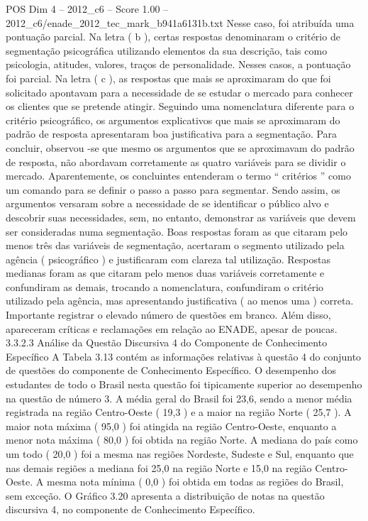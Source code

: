 \begin{textsample}{POS Dim 4 – 2012\_c6 – Score 1.00 – 2012\_c6/enade\_2012\_tec\_mark\_b941a6131b.txt}
Nesse caso, foi atribuída uma pontuação parcial.
Na letra ( b ), certas respostas denominaram o critério de segmentação psicográfica utilizando elementos da sua descrição, tais como psicologia, atitudes, valores, traços de personalidade.
Nesses casos, a pontuação foi parcial.
Na letra ( c ), as respostas que mais se aproximaram do que foi solicitado apontavam para a necessidade de se estudar o mercado para conhecer os clientes que se pretende atingir.
Seguindo uma nomenclatura diferente para o critério psicográfico, os argumentos explicativos que mais se aproximaram do padrão de resposta apresentaram boa justificativa para a segmentação.
Para concluir, observou -se que mesmo os argumentos que se aproximavam do padrão de resposta, não abordavam corretamente as quatro variáveis para se dividir o mercado.
Aparentemente, os concluintes entenderam o termo “ critérios ” como um comando para se definir o passo a passo para segmentar.
Sendo assim, os argumentos versaram sobre a necessidade de se identificar o público alvo e descobrir suas necessidades, sem, no entanto, demonstrar as variáveis que devem ser consideradas numa segmentação.
Boas respostas foram as que citaram pelo menos três das variáveis de segmentação, acertaram o segmento utilizado pela agência ( psicográfico ) e justificaram com clareza tal utilização.
Respostas medianas foram as que citaram pelo menos duas variáveis corretamente e confundiram as demais, trocando a nomenclatura, confundiram o critério utilizado pela agência, mas apresentando justificativa ( ao menos uma ) correta.
Importante registrar o elevado número de questões em branco.
Além disso, apareceram críticas e reclamações em relação ao ENADE, apesar de poucas. 3.3.2.3 Análise da Questão Discursiva 4 do Componente de Conhecimento Específico A Tabela 3.13 contém as informações relativas à questão 4 do conjunto de questões do componente de Conhecimento Específico.
O desempenho dos estudantes de todo o Brasil nesta questão foi tipicamente superior ao desempenho na questão de número 3.
A média geral do Brasil foi 23,6, sendo a menor média registrada na região Centro-Oeste ( 19,3 ) e a maior na região Norte ( 25,7 ).
A maior nota máxima ( 95,0 ) foi atingida na região Centro-Oeste, enquanto a menor nota máxima ( 80,0 ) foi obtida na região Norte.
A mediana do país como um todo ( 20,0 ) foi a mesma nas regiões Nordeste, Sudeste e Sul, enquanto que nas demais regiões a mediana foi 25,0 na região Norte e 15,0 na região Centro-Oeste.
A mesma nota mínima ( 0,0 ) foi obtida em todas as regiões do Brasil, sem exceção.
O Gráfico 3.20 apresenta a distribuição de notas na questão discursiva 4, no componente de Conhecimento Específico.

\end{textsample}

